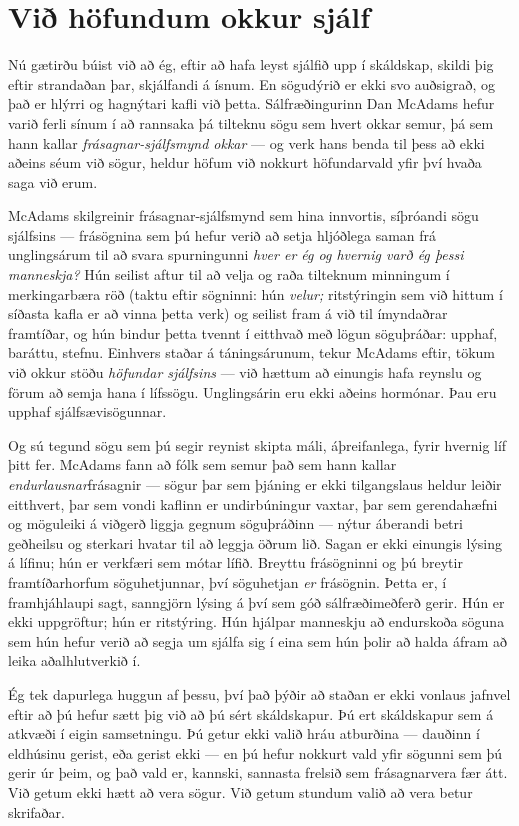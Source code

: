 \section*{Við höfundum okkur sjálf}

Nú gætirðu búist við að ég, eftir að hafa leyst sjálfið upp í skáldskap, skildi þig eftir strandaðan þar, skjálfandi á ísnum. En sögudýrið er ekki svo auðsigrað, og það er hlýrri og hagnýtari kafli við þetta. Sálfræðingurinn Dan McAdams hefur varið ferli sínum í að rannsaka þá tilteknu sögu sem hvert okkar semur, þá sem hann kallar \emph{frásagnar-sjálfsmynd okkar} — og verk hans benda til þess að ekki aðeins séum við sögur, heldur höfum við nokkurt höfundarvald yfir því hvaða saga við erum.

McAdams skilgreinir frásagnar-sjálfsmynd sem hina innvortis, síþróandi sögu sjálfsins — frásögnina sem þú hefur verið að setja hljóðlega saman frá unglingsárum til að svara spurningunni \emph{hver er ég og hvernig varð ég þessi manneskja?} Hún seilist aftur til að velja og raða tilteknum minningum í merkingarbæra röð (taktu eftir sögninni: hún \emph{velur;} ritstýringin sem við hittum í síðasta kafla er að vinna þetta verk) og seilist fram á við til ímyndaðrar framtíðar, og hún bindur þetta tvennt í eitthvað með lögun söguþráðar: upphaf, baráttu, stefnu. Einhvers staðar á táningsárunum, tekur McAdams eftir, tökum við okkur stöðu \emph{höfundar sjálfsins} — við hættum að einungis hafa reynslu og förum að semja hana í lífssögu. Unglingsárin eru ekki aðeins hormónar. Þau eru upphaf sjálfsævisögunnar.

Og sú tegund sögu sem þú segir reynist skipta máli, áþreifanlega, fyrir hvernig líf þitt fer. McAdams fann að fólk sem semur það sem hann kallar \emph{endurlausnar}frásagnir — sögur þar sem þjáning er ekki tilgangslaus heldur leiðir eitthvert, þar sem vondi kaflinn er undirbúningur vaxtar, þar sem gerendahæfni og möguleiki á viðgerð liggja gegnum söguþráðinn — nýtur áberandi betri geðheilsu og sterkari hvatar til að leggja öðrum lið. Sagan er ekki einungis lýsing á lífinu; hún er verkfæri sem mótar lífið. Breyttu frásögninni og þú breytir framtíðarhorfum söguhetjunnar, því söguhetjan \emph{er} frásögnin. Þetta er, í framhjáhlaupi sagt, sanngjörn lýsing á því sem góð sálfræðimeðferð gerir. Hún er ekki uppgröftur; hún er ritstýring. Hún hjálpar manneskju að endurskoða söguna sem hún hefur verið að segja um sjálfa sig í eina sem hún þolir að halda áfram að leika aðalhlutverkið í.

Ég tek dapurlega huggun af þessu, því það þýðir að staðan er ekki vonlaus jafnvel eftir að þú hefur sætt þig við að þú sért skáldskapur. Þú ert skáldskapur sem á atkvæði í eigin samsetningu. Þú getur ekki valið hráu atburðina — dauðinn í eldhúsinu gerist, eða gerist ekki — en þú hefur nokkurt vald yfir sögunni sem þú gerir úr þeim, og það vald er, kannski, sannasta frelsið sem frásagnarvera fær átt. Við getum ekki hætt að vera sögur. Við getum stundum valið að vera betur skrifaðar.

